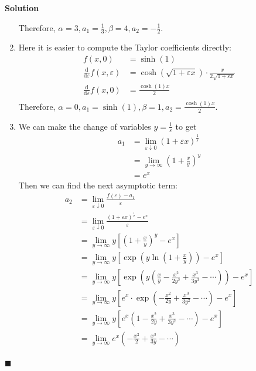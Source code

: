 \documentclass[11pt]{article}
\newcommand{\vep}{\varepsilon}
\theoremstyle{problemstyle}
\newenvironment{solution}
  {\noindent\textbf{Solution}\quad}
  {\hfill$\blacksquare$\par\vspace{1em}}
\begin{document}
\begin{solution}
\begin{enumerate}
      Therefore, $\alpha = 3, a_1 = \frac{1}{3}, \beta = 4, a_2 = -\frac{1}{2}$.
    \item Here it is easier to compute the Taylor coefficients directly: 
      \begin{align*}
        f(x, 0) & = \sinh(1) \\
        \frac{\mathrm{d}}{\mathrm{d}\vep} f(x, \vep) & = \cosh\left( \sqrt{1 + \vep x}\right ) \cdot
          \frac{x}{2\sqrt{ 1 + \vep x }} \\
        \frac{\mathrm{d}}{\mathrm{d}\vep} f(x, 0) & = \frac{\cosh(1) x}{2} \\
      \end{align*}
      Therefore, $\alpha = 0, a_1 = \sinh(1), \beta = 1, a_2 = \frac{\cosh(1) x}{2}$.
    \item We can make the change of variables $y = \frac{1}{\vep}$ to get
      \begin{align*}
        a_1 &= \lim_{\vep \downarrow 0} \left(1 + \vep x\right)^{\frac{1}{\vep}} \\
            & = \lim_{y \to \infty} \left(1 + \frac{x}{y} \right)^y \\
            & = e^x
      \end{align*}
      Then we can find the next asymptotic term:
      \begin{align*}
        a_2 & = \lim_{\vep \downarrow 0} \frac{f(\vep) - a_1}{\vep} \\
            & = \lim_{\vep \downarrow 0} \frac{ ( 1 + \vep x )^\frac{1}{\vep} - e^x}{\vep} \\
            & = \lim_{y \to \infty} y \left[ \left( 1 + \frac{x}{y} \right)^y - e^x \right] \\
            & = \lim_{y \to \infty} y \left[ \exp\left(y\ln(1 + \tfrac{x}{y})\right) - e^x \right] \\
            & = \lim_{y \to \infty} y \left[ \exp\left(y \left( \frac{x}{y} - \frac{x^2}{2y^2} +
                \frac{x^3}{3y^3} - \cdots \right) \right) - e^x \right] \\
            & = \lim_{y \to \infty} y \left[ e^x \cdot \exp\left(-\frac{x^2}{2y} + \frac{x^3}{3y^2}
                - \cdots \right) - e^x \right] \\
            & = \lim_{y \to \infty} y \left[ e^x \left(1 -\frac{x^2}{2y} + \frac{x^3}{3y^2} - \cdots
                \right) - e^x \right] \\
            & = \lim_{y \to \infty} e^x \left(-\frac{x^2}{2} + \frac{x^3}{3y} - \cdots \right) \\

\end{align*}
\end{enumerate}
\end{solution}
\end{document}
